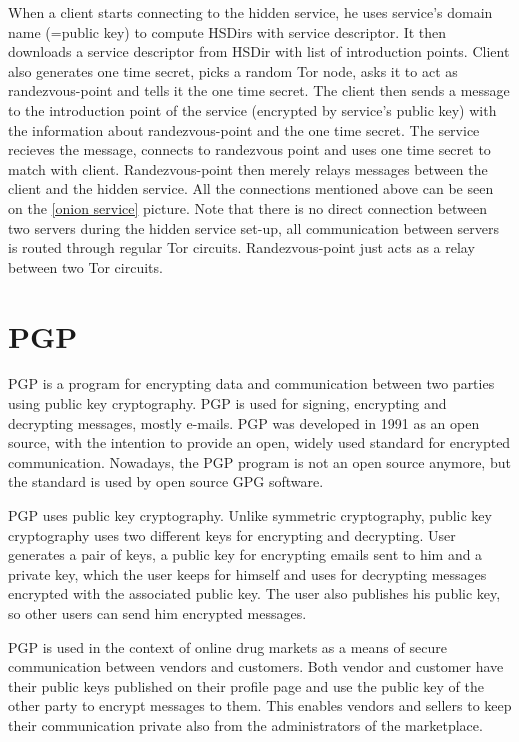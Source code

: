 \documentclass[
  digital, %
  table,   %
  lof,     %
  lot,     %
  oneside
]{fithesis3}
\begin{document}
When a client starts connecting to the hidden service, he uses service's domain name (=public key)
to compute HSDirs with service descriptor. It then downloads a service descriptor from HSDir with list
of introduction points. Client also generates one time secret, picks a random Tor node, asks
it to act as randezvous-point and tells it the one time secret. 
The client then sends a message to the introduction point of the service (encrypted by service's public key)
with the information about randezvous-point and the one time secret. The service recieves the message, connects 
to randezvous point and uses one time secret to match with client.
Randezvous-point then merely relays messages between the client and the hidden service.
All the connections mentioned above can be seen on the \ref{onion service} picture.
Note that there is no direct connection between two servers during the hidden service set-up,
all communication between servers is routed through regular Tor circuits.
Randezvous-point just acts as a relay between two Tor circuits.

\section{PGP}

PGP \parencite{Zimmermann:1995:OPU:202735} is a program for encrypting data
and communication between two parties using public key cryptography.
PGP is used for signing, encrypting and decrypting messages, mostly e-mails.
PGP was developed in 1991 as an open source, with the intention 
to provide an open, widely used standard for encrypted communication.
Nowadays, the PGP program is not an open source anymore, but the standard is used by open source GPG software.

PGP uses public key cryptography. Unlike symmetric cryptography, public key cryptography
uses two different keys for encrypting and decrypting.
User generates a pair of keys, a public key for encrypting emails sent to him and a private key, which the user
 keeps for himself and uses for decrypting messages encrypted with the associated public key.
 The user also publishes his public key, so other users can send him encrypted messages.

PGP is used in the context of online drug markets as a means of secure communication between vendors and customers.
Both vendor and customer have their public keys published on their profile page and use the public key of the other
party to encrypt messages to them. This enables vendors and sellers to keep their communication private also from the administrators of the marketplace.
\end{document}
